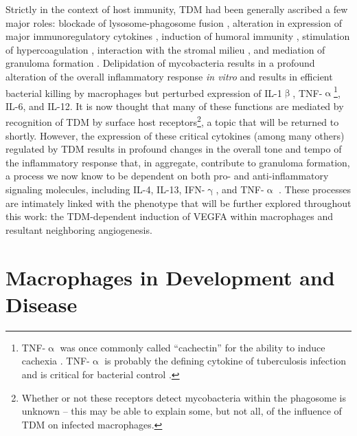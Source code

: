 Strictly in the context of host immunity, TDM had been generally ascribed a few major roles: blockade of lysosome\hyp{}phagosome fusion \citep{Indrigo2003, Patin2017b, Axelrod2008}, alteration in expression of major immunoregulatory cytokines \citep{Indrigo2002, Bowdish2009, Perez2000, Sakamoto2013}, induction of humoral immunity \citep{Ryll2001, Fujiwara1999, Fujita2005}, stimulation of hypercoagulation \citep{Donnachie2016, Retzinger1982, Retzinger1987}, interaction with the stromal milieu \citep{Sakamoto2010}, and mediation of granuloma formation \citep{Bekierkunst1968, Hunter2006b, Lee2012}. Delipidation of mycobacteria results in a profound alteration of the overall inflammatory response \textit{in vitro} and results in efficient bacterial killing by macrophages but perturbed expression of IL\hyp{}1$\upbeta$, TNF\hyp{}$\upalpha$\footnote{TNF\hyp{}$\upalpha$ was once commonly called ``cachectin'' for the ability to induce cachexia \citep{Tracey1988}. TNF\hyp{}$\upalpha$ is probably the defining cytokine of tuberculosis infection and is critical for bacterial control \citep{Orme1998}.}, IL\hyp{}6, and IL\hyp{}12. It is now thought that many of these functions are mediated by recognition of TDM by surface host receptors\footnote{Whether or not these receptors detect mycobacteria within the phagosome is unknown -- this may be able to explain some, but not all, of the influence of TDM on infected macrophages.}, a topic that will be returned to shortly. However, the expression of these critical cytokines (among many others) regulated by TDM results in profound changes in the overall tone and tempo of the inflammatory response that, in aggregate, contribute to granuloma formation, a process we now know to be dependent on both pro\hyp{} and anti\hyp{}inflammatory signaling molecules, including IL\hyp{}4, IL\hyp{}13, IFN\hyp{}$\upgamma$, and TNF\hyp{}$\upalpha$ \citep{Cronan2021, Cavalcanti2012, Flynn1993, Cooper1993, Kaneko1999, Bergeron1997, Akdis2011}. These processes are intimately linked with the phenotype that will be further explored throughout this work: the TDM\hyp{}dependent induction of VEGFA within macrophages and resultant neighboring angiogenesis.

\section{Macrophages in Development and Disease}\label{macrophages}

